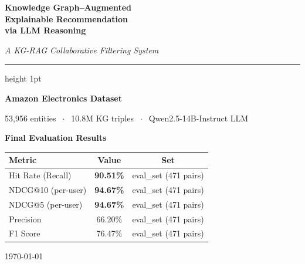 \documentclass[12pt,a4paper]{article}
\begin{document}

\begin{titlepage}
\centering
\vspace*{2cm}
{\Huge\bfseries\color{myblue}
  Knowledge Graph--Augmented\\[0.3em]
  Explainable Recommendation\\[0.3em]
  via LLM Reasoning\par}
\vspace{1.5cm}
{\Large\itshape A KG-RAG Collaborative Filtering System\par}
\vspace{0.5cm}
\hrule height 1pt
\vspace{0.5cm}
{\large\bfseries Amazon Electronics Dataset\par}
\vspace{0.3cm}
{\normalsize
  53,956 entities $\;\cdot\;$ 10.8M KG triples $\;\cdot\;$
  Qwen2.5-14B-Instruct LLM\par}
\vspace{2cm}

\fboxsep=12pt
\colorbox{myblue!10}{%
  \begin{minipage}{0.75\textwidth}
    \centering
    \large
    \textbf{Final Evaluation Results}\\[0.6em]
    \begin{tabular}{lcc}
      \toprule
      \textbf{Metric} & \textbf{Value} & \textbf{Set} \\
      \midrule
      Hit Rate (Recall)   & \textbf{90.51\%} & eval\_set (471 pairs) \\
      NDCG@10 (per-user)  & \textbf{94.67\%} & eval\_set (471 pairs) \\
      NDCG@5  (per-user)  & \textbf{94.67\%} & eval\_set (471 pairs) \\
      Precision           & 66.20\%          & eval\_set (471 pairs) \\
      F1 Score            & 76.47\%          & eval\_set (471 pairs) \\
      \bottomrule
    \end{tabular}
  \end{minipage}%
}

\vfill
{\large\today\par}
\end{titlepage}

\tableofcontents
\newpage
\end{document}
